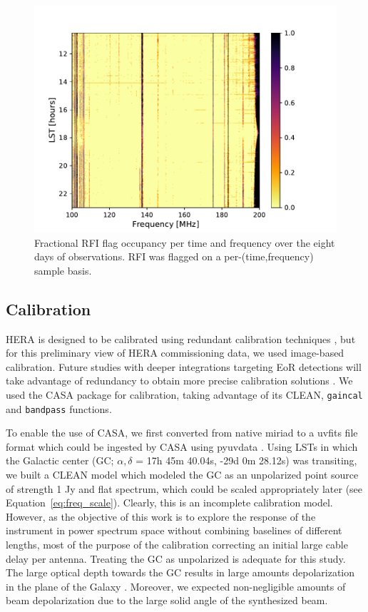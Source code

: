 \documentclass[twocolumn, trackchanges]{aastex61}
\begin{document}
\begin{figure}
\centering
\includegraphics[scale=0.6]{frac_occ.pdf}
\caption{Fractional RFI flag occupancy per time and frequency over the eight days of observations. RFI was flagged on a per-(time,frequency) sample basis.}
\label{fig:rfi}
\end{figure}

\subsection{Calibration}
\label{subsec:cal}

HERA is designed to be calibrated using redundant calibration techniques \citep{DillonParsons16}, but for this preliminary view of HERA commissioning data, we used image-based calibration. Future studies with deeper integrations targeting EoR detections will take advantage of redundancy to obtain more precise calibration solutions \citep{deBoer17}. We used the {\sc CASA} \citep{casa} package for calibration, taking advantage of its CLEAN, {\tt gaincal} and {\tt bandpass} functions.

To enable the use of {\sc CASA}, we first converted from native {\sc miriad} to a {\sc uvfits} file format which could be ingested by {\sc CASA} using {\sc pyuvdata} \citep{pyuvdata}. 
Using LSTs in which the Galactic center (GC; $\alpha, \delta$ = 17h 45m 40.04s,​ ​-29d 0m 28.12s) was transiting, we built a CLEAN model which modeled the GC as an unpolarized point source of strength 1 Jy and flat spectrum, which could be scaled appropriately later (see Equation~\ref{eq:freq_scale}). 
Clearly, this is an incomplete calibration model. However, as the objective of this work is to explore the response of the instrument in power spectrum space without combining baselines of different lengths, most of the purpose of the calibration  correcting an initial large cable delay per antenna. 
Treating the GC as unpolarized is adequate for this study. The large optical depth towards the GC \citep{Oppermann.12} results in large amounts depolarization in the plane of the Galaxy \citep{Wolleben.06}. Moreover, we expected non-negligible amounts of beam depolarization due to the large solid angle of the synthesized beam.
\end{document}
